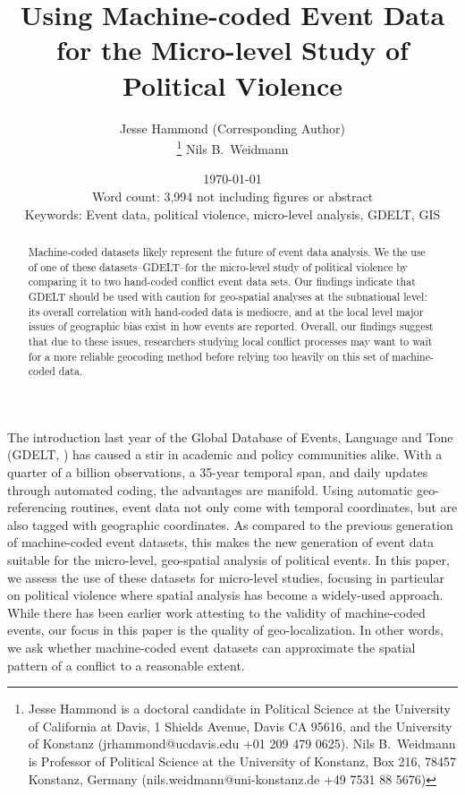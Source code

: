 \documentclass[hidelinks]{article}
\begin{document}
\title{Using Machine-coded Event Data for the Micro-level Study of Political Violence}
\author{Jesse Hammond (Corresponding Author) \\
\let\thefootnote\relax\footnote{Jesse Hammond is a doctoral candidate in Political Science at the University of California at Davis, 1 Shields Avenue, Davis CA 95616, and the University of Konstanz (jrhammond@ucdavis.edu +01 209 479 0625). Nils B.~Weidmann is Professor of Political Science at the University of Konstanz, Box 216, 78457 Konstanz, Germany (nils.weidmann@uni-konstanz.de +49 7531 88 5676)}
Nils B.~Weidmann}
\date{\today\\[5mm]Word count: 3,994 not including figures or abstract\\[5mm]
Keywords: Event data, political violence, micro-level analysis, GDELT, GIS}

\maketitle


\begin{abstract}
Machine-coded datasets likely represent the future of event data analysis. We the use of one of these datasets--GDELT--for the micro-level study of political violence by comparing it to two hand-coded conflict event data sets. Our findings indicate that GDELT should be used with caution for geo-spatial analyses at the subnational level: its overall correlation with hand-coded data is mediocre, and at the local level major issues of geographic bias exist in how events are reported. Overall, our findings suggest that due to these issues, researchers studying local conflict processes may want to wait for a more reliable geocoding method before relying too heavily on this set of machine-coded data.
\end{abstract}

\doublespacing 

The introduction last year of the Global Database of Events, Language and Tone (GDELT, \citealt{leetaru13gdelt}) has caused a stir in academic and policy communities alike. With a quarter of a billion observations, a 35-year temporal span, and daily updates through automated coding, the advantages are manifold. Using automatic geo-referencing routines, event data not only come with temporal coordinates, but are also tagged with geographic coordinates. As compared to the previous generation of machine-coded event datasets, this makes the new generation of event data suitable for the micro-level, geo-spatial analysis of political events. In this paper, we assess the use of these datasets for micro-level studies, focusing in particular on political violence where spatial analysis has become a widely-used approach. While there has been earlier work attesting to the validity of machine-coded events, our focus in this paper is the quality of geo-localization. In other words, we ask whether machine-coded event datasets can approximate the spatial pattern of a conflict to a reasonable extent.  
\end{document}
